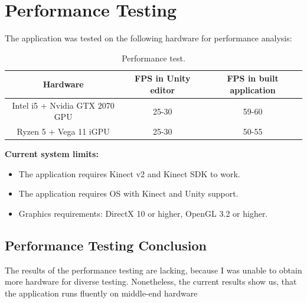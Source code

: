 \documentclass[a4paper]{report}
\begin{document}
\section{Performance Testing}
    
    The application was tested on the following hardware for performance analysis:

    \begin{table} [H]
        \centering
        \begin{tabular}{| c | c | c |} 
            \hline
            Hardware                         &   FPS in Unity editor   &   FPS in built application              \\
            \hline
            Intel i5 + Nvidia GTX 2070 GPU     & 25-30             & 59-60   \\
            \hline
            Ryzen 5 + Vega 11 iGPU             & 25-30             & 50-55   \\
            \hline
        \end{tabular}
        \caption{\label{tab:performanceTest}Performance test.}
    \end{table}
    

       \textbf{Current system limits:}
    \begin{itemize}
        \item The application requires Kinect v2 and Kinect SDK to work.
        \item The application requires OS with Kinect and Unity support.
        \item Graphics requirements: DirectX 10 or higher, OpenGL 3.2 or higher.
    \end{itemize}
  
    \subsection{Performance Testing Conclusion}
    \qquad The results of the performance testing are lacking, because I was unable to obtain more hardware for diverse testing. Nonetheless, the current results show us, that the application runs fluently on middle-end hardware 




\end{document}
